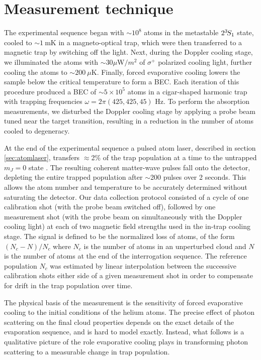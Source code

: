 \section{Measurement technique}

	The experimental sequence began with $\sim10^8$ atoms in the metastable $2^{3\!} S_1$ state, cooled to  $\sim1~\textrm{mK}$ in a magneto-optical trap, which were then transferred to a magnetic trap by switching off the light.
	Next, during the Doppler cooling stage, we illuminated the atoms with $\sim$30$\mu$W$/m^2$ of $\sigma^+$ polarized cooling light, further cooling the atoms to $\sim200~\mu \textrm{K}$.
	Finally, forced evaporative cooling lowers the sample below the critical temperature to form a BEC.
	Each iteration of this procedure produced a BEC of $\sim 5\times10^5$ atoms in a cigar-shaped harmonic trap with trapping frequencies $\omega = 2\pi (425,425,45)$ Hz.
	To perform the absorption measurements, we disturbed the Doppler cooling stage by applying a probe beam tuned near the target transition, resulting in a reduction in the number of atoms cooled to degeneracy. 
	

	At the end of the experimental sequence a pulsed atom laser, described in section \ref{sec:atomlaser}, transfers $\approx$2\% of the trap population at a time to the untrapped $m_J=0$ state \cite{Manning10,Henson18_BCR}.
	The resulting coherent matter-wave pulses fall onto the detector, {depleting the entire trapped population after $\sim$200 pulses over 2 seconds.
	This allows}  the atom number and temperature to be accurately determined without saturating the detector.
	Our data collection protocol consisted of a cycle of one calibration shot (with the probe beam switched off), followed by one measurement shot (with the probe beam on simultaneously with the Doppler cooling light) at each of two magnetic field strengths used in the in-trap cooling stage.
	The signal is defined to be the normalized loss of atoms, of the form $(N_c-N)/N_c$ where $N_c$ is the number of atoms in an unperturbed cloud and $N$ is the number of atoms at the end of the interrogation sequence.  
	The reference population $N_c$ was estimated by linear interpolation between the successive calibration shots either side of a given measurement shot in order to compensate for drift in the trap population over time.
	
	The physical basis of the measurement is the sensitivity of forced evaporative cooling to the initial conditions of the helium atoms.
	The precise effect of photon scattering on the final cloud properties depends on the exact details of the evaporation sequence, and is hard to model exactly.
	Instead, what follows is a qualitative picture of the role evaporative cooling plays in transforming photon scattering to a measurable change in trap population.


